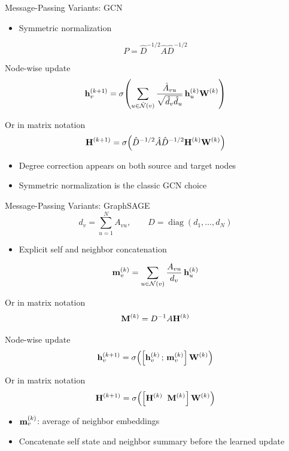 \documentclass[10pt,aspectratio=169]{ntuabeamer}
\begin{document}
\begin{frame}{Message-Passing Variants: GCN}
  \begin{itemize}
    \item Symmetric normalization
  \end{itemize}
  \[
    P = \hat{D}^{-1/2}\hat{A}\hat{D}^{-1/2}
  \]

  \textcolor{ntuablue}{Node-wise update}
  \[
    \mathbf{h}_{v}^{(k+1)} =
    \sigma\!\left(
      \sum_{u \in \hat{\mathcal N}(v)}
      \frac{\hat{A}_{vu}}{\sqrt{\hat{d}_{v}\hat{d}_{u}}} \,
      \mathbf{h}_{u}^{(k)} \mathbf{W}^{(k)}
    \right)
  \]

  \textcolor{ntuablue}{Or in matrix notation}
  \[
    \mathbf{H}^{(k+1)} =
    \sigma\!\left(
      \hat{D}^{-1/2}\hat{A}\hat{D}^{-1/2}\mathbf{H}^{(k)} \mathbf{W}^{(k)}
    \right)
  \]

  \begin{itemize}
    \item Degree correction appears on both source and target nodes
    \item Symmetric normalization is the classic GCN choice
  \end{itemize}
\end{frame}

\begin{frame}{Message-Passing Variants: GraphSAGE}
  \small
  \[
    d_{v} = \sum_{u=1}^{N} A_{vu}, \qquad
    D = \operatorname{diag}(d_{1}, \dots, d_{N})
  \]

  \begin{itemize}
    \item Explicit self and neighbor concatenation
  \end{itemize}
  \[
    \mathbf{m}_{v}^{(k)} =
    \sum_{u \in \mathcal N(v)}
    \frac{A_{vu}}{d_{v}} \,
    \mathbf{h}_{u}^{(k)}
  \]

  \textcolor{ntuablue}{Or in matrix notation}
  \[
    \mathbf{M}^{(k)} = D^{-1}A\mathbf{H}^{(k)}
  \]

  \textcolor{ntuablue}{Node-wise update}
  \[
    \mathbf{h}_{v}^{(k+1)} =
    \sigma\!\left(
      \left[
        \mathbf{h}_{v}^{(k)} \,;\,
        \mathbf{m}_{v}^{(k)}
      \right]
      \mathbf{W}^{(k)}
    \right)
  \]

  \textcolor{ntuablue}{Or in matrix notation}
  \[
    \mathbf{H}^{(k+1)} =
    \sigma\!\left(
      \left[
        \mathbf{H}^{(k)} \;\;
        \mathbf{M}^{(k)}
      \right]
      \mathbf{W}^{(k)}
    \right)
  \]

  \begin{itemize}
    \item \(\mathbf{m}_{v}^{(k)}\): average of neighbor embeddings
    \item Concatenate self state and neighbor summary before the learned update
\end{itemize}
\end{frame}
\end{document}
